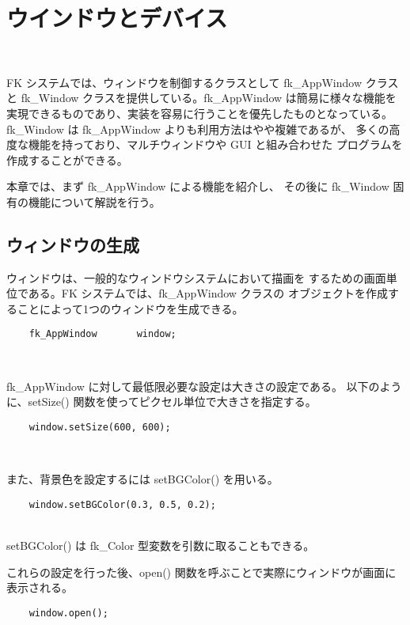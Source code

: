 \chapter{ウインドウとデバイス} \label{sec:window} ~

FK システムでは、ウィンドウを制御するクラスとして fk\_AppWindow クラスと
fk\_Window クラスを提供している。fk\_AppWindow は簡易に様々な機能を
実現できるものであり、実装を容易に行うことを優先したものとなっている。
fk\_Window は fk\_AppWindow よりも利用方法はやや複雑であるが、
多くの高度な機能を持っており、マルチウィンドウや GUI と組み合わせた
プログラムを作成することができる。

本章では、まず fk\_AppWindow による機能を紹介し、
その後に fk\_Window 固有の機能について解説を行う。

\section{ウィンドウの生成}
ウィンドウは、一般的なウィンドウシステムにおいて描画を
するための画面単位である。FK システムでは、fk\_AppWindow クラスの
オブジェクトを作成することによって1つのウィンドウを生成できる。
\\
\begin{screen}
\begin{verbatim}
    fk_AppWindow       window;
\end{verbatim}
\end{screen}
~

fk\_AppWindow に対して最低限必要な設定は大きさの設定である。
以下のように、setSize() 関数を使ってピクセル単位で大きさを指定する。
\\
\begin{screen}
\begin{verbatim}
    window.setSize(600, 600);
\end{verbatim}
\end{screen}
~

また、背景色を設定するには setBGColor() を用いる。
\\
\begin{screen}
\begin{verbatim}
    window.setBGColor(0.3, 0.5, 0.2);
\end{verbatim}
\end{screen}
~ \\
setBGColor() は fk\_Color 型変数を引数に取ることもできる。

これらの設定を行った後、open() 関数を呼ぶことで実際にウィンドウが画面に表示される。
\\
\begin{screen}
\begin{verbatim}
    window.open();
\end{verbatim}
\end{screen}
